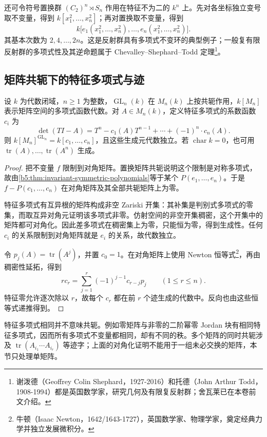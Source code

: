 还可令符号置换群 \((C_2)^n\rtimes S_n\) 作用在特征不为二的 \(k^n\) 上。先对各坐标独立变号取不变量，得到 \(k[x_1^2,\ldots,x_n^2]\)；再对置换取不变量，得到
\[
	k\bigl[e_1(x_1^2,\ldots,x_n^2),\ldots,e_n(x_1^2,\ldots,x_n^2)\bigr].
\]
其基本次数为 \(2,4,\ldots,2n\)。这是反射群具有多项式不变环的典型例子；一般复有限反射群的多项式性及其逆命题属于 Chevalley--Shephard--Todd 定理\footnote{谢泼德（Geoffrey Colin Shephard，1927-2016）和托德（John Arthur Todd，1908-1994）都是英国数学家，研究几何及有限复反射群；舍瓦莱已在本卷前文介绍。}。

\subsection{矩阵共轭下的特征多项式与迹}
\label{b5:subsec:2205:02}

\begin{theorem}\label{b5:thm:single-matrix-invariants}
	设 \(k\) 为代数闭域，\(n\ge1\) 为整数，\(\operatorname{GL}_n(k)\) 在 \(M_n(k)\) 上按共轭作用，\(k[M_n]\) 表示矩阵空间的多项式函数代数。对 \(A\in M_n(k)\)，定义特征多项式的系数函数 \(c_i\) 为
	\[
		\det(TI-A)=T^n-c_1(A)T^{n-1}+\cdots+(-1)^n\cdot c_n(A).
	\]
	则 \(k[M_n]^{\operatorname{GL}_n}=k[c_1,\ldots,c_n]\)，且这些生成元代数独立。若 \(\operatorname{char}k=0\)，也可用 \(\operatorname{tr}(A),\ldots,\operatorname{tr}(A^n)\) 生成。
\end{theorem}
\begin{proof}
	把不变量 \(f\) 限制到对角矩阵。置换矩阵共轭说明这个限制是对称多项式，故由\cref{b5:thm:invariant-symmetric-polynomials}等于某个 \(P(e_1,\ldots,e_n)\)。于是 \(f-P(c_1,\ldots,c_n)\) 在对角矩阵及其全部共轭矩阵上为零。

	特征多项式有互异根的矩阵构成非空 Zariski 开集：其补集是判别式多项式的零集，而取互异对角元证明该多项式非零。仿射空间的非空开集稠密，这个开集中的矩阵都可对角化。因此差多项式在稠密集上为零，只能恒为零，得到生成性。任何 \(c_i\) 的关系限制到对角矩阵就是 \(e_i\) 的关系，故代数独立。

	令 \(p_j(A)=\operatorname{tr}(A^j)\)，并置 \(c_0=1\)。在对角矩阵上使用 Newton 恒等式\footnote{牛顿（Isaac Newton，1642/1643-1727），英国数学家、物理学家，奠定经典力学并独立发展微积分。}，再由稠密性延拓，得到
	\[
		rc_r=\sum_{j=1}^r(-1)^{j-1}c_{r-j}p_j \qquad(1\le r\le n).
	\]
	特征零允许逐次除以 \(r\)，故每个 \(c_r\) 都在前 \(r\) 个迹生成的代数中。反向也由这些恒等式递推得到。
\end{proof}

特征多项式相同并不意味共轭。例如零矩阵与非零的二阶幂零 Jordan 块有相同特征多项式，因而所有多项式不变量都相同，却有不同的秩。多个矩阵的同时共轭涉及 \(\operatorname{tr}(A_{i_1}\cdots A_{i_r})\) 等迹字；上面的对角化证明不能用于一组未必交换的矩阵，本节只处理单矩阵。

